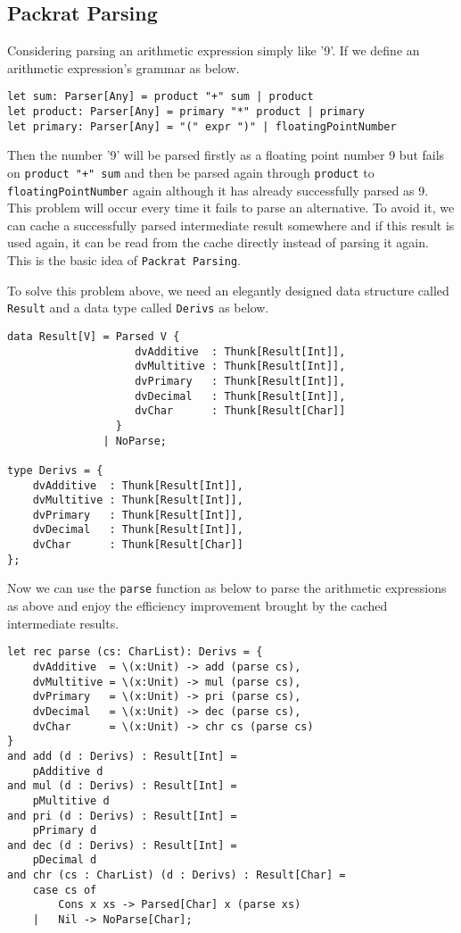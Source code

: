 \subsection{Packrat Parsing}
Considering parsing an arithmetic expression simply like '9'. If we define an arithmetic expression's grammar as below.

\begin{lstlisting}
let sum: Parser[Any] = product "+" sum | product
let product: Parser[Any] = primary "*" product | primary
let primary: Parser[Any] = "(" expr ")" | floatingPointNumber
\end{lstlisting}

Then the number '9' will be parsed firstly as a floating point number 9 but fails on \texttt{product "+" sum} and then be parsed again through \texttt{product} to \texttt{floatingPointNumber} again although it has already successfully parsed as 9. This problem will occur every time it fails to parse an alternative. To avoid it, we can cache a successfully parsed intermediate result somewhere and if this result is used again, it can be read from the cache directly instead of parsing it again. This is the basic idea of \texttt{Packrat Parsing}.

To solve this problem above, we need an elegantly designed data structure called \texttt{Result} and a data type called \texttt{Derivs} as below.

\begin{lstlisting}
data Result[V] = Parsed V {
                    dvAdditive  : Thunk[Result[Int]],
                    dvMultitive : Thunk[Result[Int]],
                    dvPrimary   : Thunk[Result[Int]],
                    dvDecimal   : Thunk[Result[Int]],
                    dvChar      : Thunk[Result[Char]]
                 }
               | NoParse;

type Derivs = {
    dvAdditive  : Thunk[Result[Int]],
    dvMultitive : Thunk[Result[Int]],
    dvPrimary   : Thunk[Result[Int]],
    dvDecimal   : Thunk[Result[Int]],
    dvChar      : Thunk[Result[Char]]
};
\end{lstlisting}

Now we can use the \texttt{parse} function as below to parse the arithmetic expressions as above and enjoy the efficiency improvement brought by the cached intermediate results.

\begin{lstlisting}
let rec parse (cs: CharList): Derivs = {
    dvAdditive  = \(x:Unit) -> add (parse cs),
    dvMultitive = \(x:Unit) -> mul (parse cs),
    dvPrimary   = \(x:Unit) -> pri (parse cs),
    dvDecimal   = \(x:Unit) -> dec (parse cs),
    dvChar      = \(x:Unit) -> chr cs (parse cs)
}
and add (d : Derivs) : Result[Int] =
    pAdditive d
and mul (d : Derivs) : Result[Int] =
    pMultitive d
and pri (d : Derivs) : Result[Int] =
    pPrimary d
and dec (d : Derivs) : Result[Int] =
    pDecimal d
and chr (cs : CharList) (d : Derivs) : Result[Char] =
    case cs of
        Cons x xs -> Parsed[Char] x (parse xs)
    |   Nil -> NoParse[Char];
\end{lstlisting}

